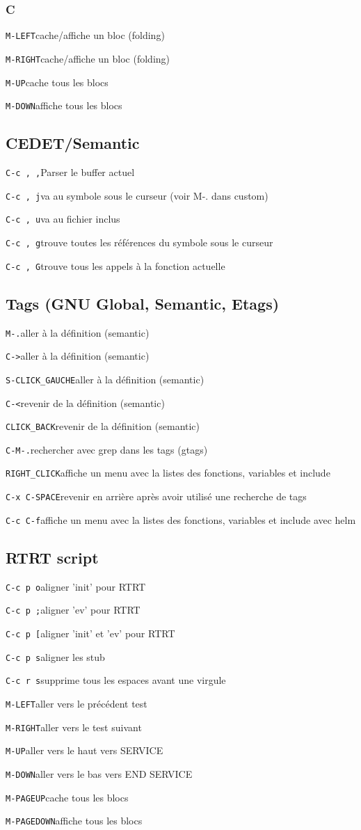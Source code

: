 \documentclass[10pt,landscape]{article}
\def\cm#1#2{{\tt#1}\dotfill#2\par}
\begin{document}
\begin{multicols}{3}
\subsubsection{C}
\cm{M-LEFT}{cache/affiche un bloc (folding)}
\cm{M-RIGHT}{cache/affiche un bloc (folding)}
\cm{M-UP}{cache tous les blocs}
\cm{M-DOWN}{affiche tous les blocs}





\subsection{CEDET/Semantic}
\cm{C-c , ,}{Parser le buffer actuel}
\cm{C-c , j}{va au symbole sous le curseur (voir M-. dans custom)}
\cm{C-c , u}{va au fichier inclus}
\cm{C-c , g}{trouve toutes les références du symbole sous le curseur}
\cm{C-c , G}{trouve tous les appels à la fonction actuelle}





\subsection{Tags (GNU Global, Semantic, Etags)}
\cm{M-.}{aller à la définition (semantic)}
\cm{C-\textgreater}{aller à la définition (semantic)}
\cm{S-CLICK\_GAUCHE}{aller à la définition (semantic)}
\cm{C-\textless}{revenir de la définition (semantic)}
\cm{CLICK\_BACK}{revenir de la définition (semantic)}
\cm{C-M-.}{rechercher avec grep dans les tags (gtags)}
\cm{RIGHT\_CLICK}{affiche un menu avec la listes des fonctions, variables et include}
\cm{C-x C-SPACE}{revenir en arrière après avoir utilisé une recherche de tags}
\cm{C-c C-f}{affiche un menu avec la listes des fonctions, variables et include avec helm}





\subsection{RTRT script}
\cm{C-c p o}{aligner 'init' pour RTRT}
\cm{C-c p ;}{aligner 'ev' pour RTRT}
\cm{C-c p [}{aligner 'init' et 'ev' pour RTRT}
\cm{C-c p s}{aligner les stub}
\cm{C-c r s}{supprime tous les espaces avant une virgule}
\cm{M-LEFT}{aller vers le précédent test}
\cm{M-RIGHT}{aller vers le test suivant}
\cm{M-UP}{aller vers le haut vers SERVICE}
\cm{M-DOWN}{aller vers le bas vers END SERVICE}
\cm{M-PAGEUP}{cache tous les blocs}
\cm{M-PAGEDOWN}{affiche tous les blocs}






\end{multicols}
\end{document}
